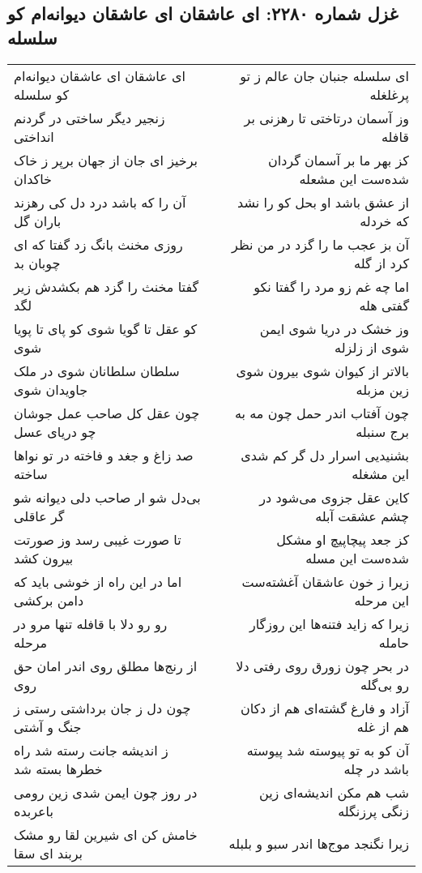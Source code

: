 \begin{center}
\section*{غزل شماره ۲۲۸۰: ای عاشقان ای عاشقان دیوانه‌ام کو سلسله}
\label{sec:2280}
\begin{longtable}{l p{0.5cm} r}
ای عاشقان ای عاشقان دیوانه‌ام کو سلسله
&&
ای سلسله جنبان جان عالم ز تو پرغلغله
\\
زنجیر دیگر ساختی در گردنم انداختی
&&
وز آسمان درتاختی تا رهزنی بر قافله
\\
برخیز ای جان از جهان برپر ز خاک خاکدان
&&
کز بهر ما بر آسمان گردان شده‌ست این مشعله
\\
آن را که باشد درد دل کی رهزند باران گل
&&
از عشق باشد او بحل کو را نشد که خردله
\\
روزی مخنث بانگ زد گفتا که ای چوبان بد
&&
آن بز عجب ما را گزد در من نظر کرد از گله
\\
گفتا مخنث را گزد هم بکشدش زیر لگد
&&
اما چه غم زو مرد را گفتا نکو گفتی هله
\\
کو عقل تا گویا شوی کو پای تا پویا شوی
&&
وز خشک در دریا شوی ایمن شوی از زلزله
\\
سلطان سلطانان شوی در ملک جاویدان شوی
&&
بالاتر از کیوان شوی بیرون شوی زین مزبله
\\
چون عقل کل صاحب عمل جوشان چو دریای عسل
&&
چون آفتاب اندر حمل چون مه به برج سنبله
\\
صد زاغ و جغد و فاخته در تو نواها ساخته
&&
بشنیدیی اسرار دل گر کم شدی این مشغله
\\
بی‌دل شو ار صاحب دلی دیوانه شو گر عاقلی
&&
کاین عقل جزوی می‌شود در چشم عشقت آبله
\\
تا صورت غیبی رسد وز صورتت بیرون کشد
&&
کز جعد پیچاپیچ او مشکل شده‌ست این مسله
\\
اما در این راه از خوشی باید که دامن برکشی
&&
زیرا ز خون عاشقان آغشته‌ست این مرحله
\\
رو رو دلا با قافله تنها مرو در مرحله
&&
زیرا که زاید فتنه‌ها این روزگار حامله
\\
از رنج‌ها مطلق روی اندر امان حق روی
&&
در بحر چون زورق روی رفتی دلا رو بی‌گله
\\
چون دل ز جان برداشتی رستی ز جنگ و آشتی
&&
آزاد و فارغ گشته‌ای هم از دکان هم از غله
\\
ز اندیشه جانت رسته شد راه خطرها بسته شد
&&
آن کو به تو پیوسته شد پیوسته باشد در چله
\\
در روز چون ایمن شدی زین رومی باعربده
&&
شب هم مکن اندیشه‌ای زین زنگی پرزنگله
\\
خامش کن ای شیرین لقا رو مشک بربند ای سقا
&&
زیرا نگنجد موج‌ها اندر سبو و بلبله
\\
\end{longtable}
\end{center}
